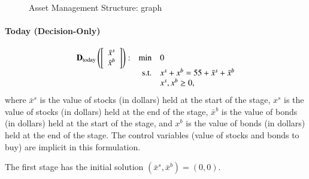 \documentclass[final,1p,times]{elsarticle}
\newcommand{\twovec}[2]{\left[\begin{array}{c} #1 \\ #2 \end{array}\right]}
\newcommand{\drawHDsquiggle}[1]{\draw[-stealth, decoration={snake, amplitude = .4mm, segment length = 1.5mm, post length=0.9mm},decorate] (#1)+(-0.75, 0.5) -- (#1);}
\begin{document}
\begin{figure}[!ht]
    \centering
{}
\caption{Asset Management Structure: graph}
\end{figure}

\paragraph{Today (Decision-Only)}
\begin{equation}
    \begin{array}{l r l}
        \text{\textbf{D}}_{\text{today}}\left(\twovec{\bar{x}^s}{\bar{x}^b}\right): & \min & 0 \\
        & \text{s.t.} & x^s + x^b  = 55 + \bar{x}^s + \bar{x}^b \\
        & & x^s, x^b \ge 0,
    \end{array}
\end{equation}
where $\bar{x}^s$ is the value of stocks (in dollars) held at the start of the stage, $x^s$ is the value of stocks (in dollars) held at the end of the stage, $\bar{x}^b$ is the value of bonds (in dollars) held at the start of the stage, and $x^b$ is the value of bonds (in dollars) held at the end of the stage. The control variables (value of stocks and bonds to buy) are implicit in this formulation.

The first stage has the initial solution $(\bar{x}^s, \bar{x}^b) = (0,0)$. 
\end{document}
